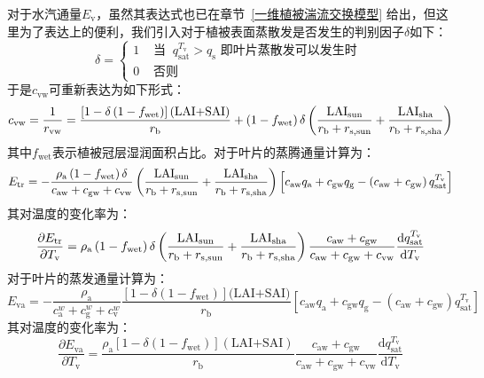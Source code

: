对于水汽通量$E_{\mathrm{v}}$，虽然其表达式也已在章节~\ref{一维植被湍流交换模型} 给出，但这里为了表达上的便利，我们引入对于植被表面蒸散发是否发生的判别因子$\delta$如下：
\begin{equation}
  \label{delta_cal}
  \delta=
  \begin{cases}
    1 & \text { 当 }\ q_{\mathrm{s a t}}^{T_{\mathrm{v}}}>q_{\mathrm{s}} \text { 即叶片蒸散发可以发生时 } \\
    0 & \text { 否则 }
  \end{cases}
\end{equation}
于是$c_{\mathrm{vw}}$可重新表达为如下形式：
\begin{equation}
  c_{\mathrm{vw}}=\frac{1}{r_{\mathrm{vw}}}=\frac{\left[1-\delta\left(1-f_{\mathrm{wet}}\right)\right](\text{LAI+SAI})}{r_{\mathrm{b}}}+\left( 1 - f_{\mathrm{wet}} \right)\delta\left( \frac{\rm LAI_{\mathrm{sun}}}{r_{\mathrm{b}} + r_{\mathrm{s,\rm sun}}} + \frac{\rm LAI_{\mathrm{sha}}}{r_{\mathrm{b}} + r_{\mathrm{s,\rm sha}}} \right)
\end{equation}
其中$f_{\mathrm{wet}}$表示植被冠层湿润面积占比。对于叶片的蒸腾通量计算为：
\begin{equation}
  E_{\mathrm{tr}} = -\frac{\rho_{\mathrm{a}}\left(1-f_{\mathrm{w e t}}\right)\delta }{c_{\mathrm{aw}}+c_{\mathrm{gw}}+c_{\mathrm{vw}}}\left( \frac{\rm LAI_{\mathrm{sun}}}{r_{\mathrm{b}} + r_{\mathrm{s,\rm sun}}} + \frac{\rm LAI_{\mathrm{sha}}}{r_{\mathrm{b}} + r_{\mathrm{s,\rm sha}}} \right) \left[c_{\mathrm{aw}} q_{\mathrm{a}}+c_{\mathrm{gw}} q_{\mathrm{g}}-\left(c_{\mathrm{aw}}+c_{\mathrm{gw}}\right) q_{\mathrm{s a t}}^{T_{\mathrm{v}}}\right]
\end{equation}
其对温度的变化率为：
\begin{equation}
  \frac{\partial E_{\mathrm{tr}}}{\partial T_{\mathrm{v}}} = \rho_{\mathrm{a}} \left(1-f_{\mathrm{w e t}}\right) \delta \left( \frac{\rm LAI_{\mathrm{sun}}}{r_{\mathrm{b}} + r_{\mathrm{s, \rm sun}}} + \frac{\rm LAI_{\mathrm{sha}}}{r_{\mathrm{b}} + r_{\mathrm{s,\rm sha}}} \right)\frac{c_{\mathrm{aw}}+c_{\mathrm{gw}}}{c_{\mathrm{aw}}+c_{\mathrm{gw}}+c_{\mathrm{vw}}} \frac{{\mathrm {d}} q_{\mathrm{s a t}}^{T_{\mathrm{v}}}}{{\mathrm {d}} T_{\mathrm{v}}}
\end{equation}
对于叶片的蒸发通量计算为：
\begin{equation}
  E_{\mathrm{va}} = -\frac{\rho_{\mathrm{a}}}{c_{\mathrm{a}}^{w}+c_{\mathrm{g}}^{w}+c_{\mathrm{v}}^{w}} \frac{\left[1-\delta\left(1-f_{\mathrm{w e t}}\right)\right](\text {LAI+SAI)}}{r_{\mathrm{b}}}\left[c_{\mathrm{aw}} q_{\mathrm{a}}+c_{\mathrm{gw}} q_{\mathrm{g}}-\left(c_{\mathrm{aw}}+c_{\mathrm{gw}}\right) q_{\mathrm{sat}}^{T_{\mathrm{v}}}\right]
\end{equation}
其对温度的变化率为：
\begin{equation}
  \frac{\partial E_{\mathrm{va}}}{\partial T_{\mathrm{v}}} = \frac{\rho_{\mathrm{a}}\left[1-\delta\left(1-f_{\mathrm{w e t}}\right)\right](\text {LAI+SAI})}{r_{\mathrm{b}}} \frac{c_{\mathrm{aw}}+c_{\mathrm{gw}}}{c_{\mathrm{aw}}+c_{\mathrm{gw}}+c_{\mathrm{vw}}} \frac{{\mathrm {d}} q_{\mathrm{s a t}}^{T_{\mathrm{v}}}}{{\mathrm {d}} T_{\mathrm{v}}}
\end{equation}

